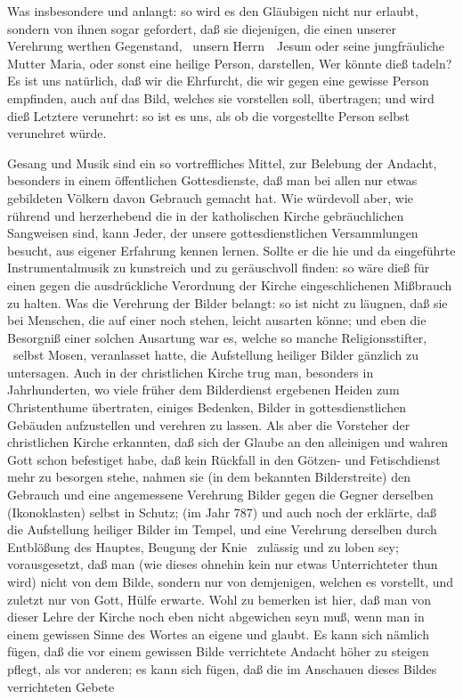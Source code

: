 \begin{aufza}
\item Was insbesondere  und  anlangt: so wird es den Gläubigen nicht nur erlaubt, sondern von ihnen sogar gefordert, daß sie diejenigen, die einen unserer Verehrung werthen Gegenstand, \zB\  unsern Herrn~\ Jesum oder seine jungfräuliche Mutter Maria, oder sonst eine heilige Person, darstellen,  Wer könnte dieß tadeln? Es ist uns natürlich, daß wir die Ehrfurcht, die wir gegen eine gewisse Person empfinden, auch auf das Bild, welches sie vorstellen soll, übertragen; und wird dieß Letztere verunehrt: so ist es uns, als ob die vorgestellte Person selbst verunehret würde.
\end{aufza}
\begin{RWanm} 
Gesang und Musik sind ein so vortreffliches Mittel, zur Belebung der Andacht, besonders in einem öffentlichen Gottesdienste, daß man bei allen nur etwas gebildeten Völkern davon Gebrauch gemacht hat. Wie würdevoll aber, wie rührend und herzerhebend die in der katholischen Kirche gebräuchlichen Sangweisen sind, kann Jeder, der unsere gottesdienstlichen Versammlungen besucht, aus eigener Erfahrung kennen lernen. Sollte er die hie und da eingeführte Instrumentalmusik zu kunstreich und zu geräuschvoll finden: so wäre dieß für einen gegen die ausdrückliche Verordnung der Kirche eingeschlichenen Mißbrauch zu halten. Was die Verehrung der Bilder belangt: so ist nicht zu läugnen, daß sie bei Menschen, die auf einer noch  stehen, leicht ausarten könne; und eben die Besorgniß einer solchen Ausartung war es, welche so manche Religionsstifter, \zB\  selbst Mosen, veranlasset hatte, die Aufstellung heiliger Bilder gänzlich zu untersagen. Auch in der christlichen Kirche trug man, besonders in Jahrhunderten, wo viele früher dem Bilderdienst ergebenen Heiden zum Christenthume übertraten, einiges Bedenken, Bilder in gottesdienstlichen Gebäuden aufzustellen und verehren zu lassen. Als aber die Vorsteher der christlichen Kirche erkannten, daß sich der Glaube an den alleinigen und wahren Gott schon befestiget habe, daß kein Rückfall in den Götzen- und Fetischdienst mehr zu besorgen stehe, nahmen sie (in dem bekannten Bilderstreite) den Gebrauch und eine angemessene Verehrung  Bilder gegen die Gegner derselben (Ikonoklasten) selbst in Schutz;  (im Jahr 787) und auch noch der  erklärte, daß die Aufstellung heiliger Bilder im Tempel, und eine Verehrung derselben durch Entblößung des Hauptes, Beugung der Knie \udgl\  zulässig und zu loben sey; vorausgesetzt, daß man (wie dieses ohnehin kein nur etwas Unterrichteter thun wird) nicht von dem Bilde, sondern nur von demjenigen, welchen es vorstellt, und zuletzt nur von Gott, Hülfe erwarte. Wohl zu bemerken ist hier, daß man von dieser Lehre der Kirche noch eben nicht abgewichen seyn muß, wenn man in einem gewissen Sinne des Wortes an eigene  und  glaubt. Es kann sich nämlich fügen, daß die vor einem gewissen Bilde verrichtete Andacht höher zu steigen pflegt, als vor anderen; es kann sich fügen, daß die im Anschauen dieses Bildes verrichteten Gebete 
\end{RWanm}
